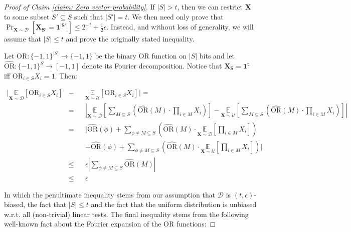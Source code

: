 \documentclass[12pt]{article}
\newcommand{\oo}[1]{\{-1,1\}^{#1}}
\newcommand{\dist}{\mathcal{D}}
\newcommand{\OR}{\mathrm{OR} }
\newcommand{\E}{\mathbb{E}}
\newcommand{\abs}[1]{\left| #1 \right|}
\renewcommand{\vec}[1]{\bm{#1}}
\begin{document}
	\begin{proof}[Proof of Claim \ref{claim: Zero vector probability}]
		
		If $\abs{S} > t$, then we can restrict $\vec{X}$ to some subset $S' \subseteq S$ such that $\abs{S'} = t$.
		We then need only prove that $\Pr_{\vec{X} \sim \dist} \left[ \vec{X_{S'}} = \vec{1^{\abs{S'}}} \right]
		\leq 2^{-t} + \frac{1}{2}\epsilon$.
		Instead, and without loss of generality, we will assume that $\abs{S} \leq t$ and prove the originally stated inequality.
		
		Let $\OR : \oo{\abs{S}} \rightarrow \{-1,1\}$ be the binary OR function on $\abs{S}$ bits and let $\widehat{\OR} : \oo{S} \rightarrow \left[-1,1\right]$ denote its Fourier decomposition.
		Notice that $\vec{X_S} = \vec{1^t}$ iff $\OR_{i \in S} X_i = 1$.
		Then:
		
		\begin{equation*}
		\begin{alignedat}{3}
			\Biggr\vert \underset{\vec{X} \sim \dist}{\E} \left[ \OR_{i \in S} X_i \right]
				&- &&\underset{\vec{X} \sim \mathcal{U}}{\E} \left[ \OR_{i \in S} X_i \right] \Biggr\vert = \\
			&= &&\abs{ \underset{\vec{X} \sim \dist}{\E}
				\left[
					\sum_{M \subseteq S} \left( \widehat{\OR}(M) \cdot \prod_{i \in M} X_i \right)
				\right]
				- \underset{\vec{X} \sim \mathcal{U}}{\E}
				\left[
					\sum_{M \subseteq S} \left( \widehat{\OR}(M) \cdot \prod_{i \in M} X_i \right)
				\right] } \\
			&= && \Bigg\vert \widehat{\OR}(\phi) + \sum_{\phi \neq M \subseteq S}
				\left(
					\widehat{\OR}(M) \cdot \underset{\vec{X} \sim \dist}{\E} \left[ \prod_{i \in M} X_i \right]
				\right) \\
			& && - \widehat{\OR}(\phi) + \sum_{\phi \neq M \subseteq S}
				\left(
				\widehat{\OR}(M) \cdot \underset{\vec{X} \sim \mathcal{U}}{\E} \left[ \prod_{i \in M} X_i \right]
				\right) \Bigg\vert \\
			&\leq && \epsilon \abs{ \sum_{\phi \neq M \subseteq S} \widehat{\OR}(M)}\\
			&\leq && \epsilon
		\end{alignedat}
		\end{equation*}
		
		In which the penultimate inequality stems from our assumption that $\dist$ is $(t,\epsilon)$-biased, the fact that $\abs{S} \leq t$ and the fact that the uniform distribution is unbiased w.r.t. all (non-trivial) linear tests.
		The final inequality stems from the following well-known fact about the Fourier expansion of the OR functions:
		

\end{proof}
\end{document}
